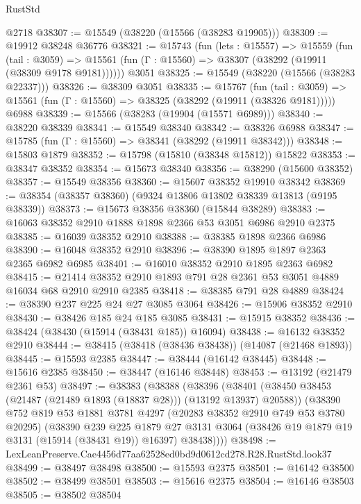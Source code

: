 \begin{lexlean}{RustStd}
\begin{coremodule}
    @2718
@38307 := @15549 (@38220 (@15566 (@38283 @19905)))
@38309 := @19912 @38248 @36776
@38321 := @15743
    (fun (lets : @15557) =>
    @15559
      (fun (tail : @3059) =>
      @15561 (fun (Γ : @15560) => @38307 (@38292 (@19911 (@38309 @9178 @9181))))))
    @3051
@38325 := @15549 (@38220 (@15566 (@38283 @22337)))
@38326 := @38309 @3051
@38335 := @15767
    (fun (tail : @3059) => @15561 (fun (Γ : @15560) => @38325 (@38292 (@19911 (@38326 @9181)))))
    @6988
@38339 := @15566 (@38283 (@19904 (@15571 @6989)))
@38340 := @38220 @38339
@38341 := @15549 @38340
@38342 := @38326 @6988
@38347 := @15785 (fun (Γ : @15560) => @38341 (@38292 (@19911 @38342)))
@38348 := @15803 @1879
@38352 := @15798 (@15810 (@38348 @15812)) @15822
@38353 := @38347 @38352
@38354 := @15673 @38340
@38356 := @38290 (@15600 @38352)
@38357 := @15549 @38356
@38360 := @15607 @38352 @19910 @38342
@38369 := @38354 (@38357 @38360) (@9324 @13806 @13802 @38339 @13813 (@9195 @38339))
@38373 := @15673 @38356 @38360 (@15844 @38289)
@38383 := @16063 @38352 @2910 @1888 @1898 @2366 @53 @3051 @6986 @2910 @2375
@38385 := @16039 @38352 @2910
@38388 := @38385 @1898 @2366 @6986
@38390 := @16048 @38352 @2910
@38396 := @38390 @1895 @1897 @2363 @2365 @6982 @6985
@38401 := @16010 @38352 @2910 @1895 @2363 @6982
@38415 := @21414 @38352 @2910 @1893 @791 @28 @2361 @53 @3051 @4889 @16034 @68 @2910 @2910 @2385
@38418 := @38385 @791 @28 @4889
@38424 := @38390 @237 @225 @24 @27 @3085 @3064
@38426 := @15906 @38352 @2910
@38430 := @38426 @185 @24 @185 @3085
@38431 := @15915 @38352
@38436 := @38424 (@38430 (@15914 (@38431 @185)) @16094)
@38438 := @16132 @38352 @2910
@38444 := @38415 (@38418 (@38436 @38438)) (@14087 (@21468 @1893))
@38445 := @15593 @2385
@38447 := @38444 (@16142 @38445)
@38448 := @15616 @2385
@38450 := @38447 (@16146 @38448)
@38453 := @13192 (@21479 @2361 @53)
@38497 := @38383
    (@38388
      (@38396
        (@38401 (@38450 @38453 (@21487 (@21489 @1893 (@18837 @28))) (@13192 @13937) @20588))
        (@38390
          @752
          @819
          @53
          @1881
          @3781
          @4297
          (@20283 @38352 @2910 @749 @53 @3780 @20295)
          (@38390
            @239
            @225
            @1879
            @27
            @3131
            @3064
            (@38426 @19 @1879 @19 @3131 (@15914 (@38431 @19)) @16397)
            @38438))))
@38498 := LexLeanPreserve.Cae4456d77aa62528ed0bd9d0612cd278.R28.RustStd.look37
@38499 := @38497 @38498
@38500 := @15593 @2375
@38501 := @16142 @38500
@38502 := @38499 @38501
@38503 := @15616 @2375
@38504 := @16146 @38503
@38505 := @38502 @38504

\end{coremodule}
\end{lexlean}
